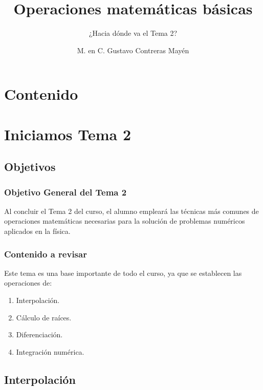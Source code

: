 \documentclass[12pt]{beamer}
\title{\large{Operaciones matemáticas básicas}}
\subtitle{¿Hacia dónde va el Tema 2?}
\author{M. en C. Gustavo Contreras Mayén}
\date{}
\begin{document}
\maketitle

\section*{Contenido}

\section{Iniciamos Tema 2}
\subsection{Objetivos}

\begin{frame}
\frametitle{Objetivo General del Tema 2}
Al concluir el Tema 2 del curso, el alumno empleará las técnicas más comunes de operaciones matemáticas necesarias para la solución de problemas numéricos aplicados en la física.
\end{frame}
\begin{frame}
\frametitle{Contenido a revisar}
Este tema es una base importante de todo el curso, ya que se establecen las operaciones de:
\begin{enumerate}[<+->]
\item Interpolación.
\item Cálculo de raíces.
\item Diferenciación.
\item Integración numérica.
\end{enumerate}
\end{frame}

\subsection*{Interpolación}
\end{document}
